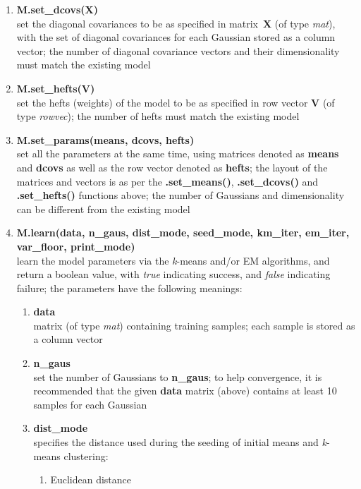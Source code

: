 \documentclass[10pt,a4paper]{article}
\begin{document}
\begin{small}
\begin{enumerate}[{$\bullet$}]
\item
{\bf M.set\_dcovs(X)}\\
set the diagonal covariances to be as specified in matrix~{\bf X} (of type {\it mat}), with the set of diagonal covariances for each Gaussian stored as a column vector;
the number of diagonal covariance vectors and their dimensionality must match the existing model

\item
{\bf M.set\_hefts(V)}\\
set the hefts (weights) of the model to be as specified in row vector {\bf V} (of type {\it rowvec});
the number of hefts must match the existing model

\pagebreak
\item
{\bf M.set\_params(means, dcovs, hefts)}\\
set all the parameters at the same time, using matrices denoted as {\bf means} and {\bf dcovs} as well as the row vector denoted as {\bf hefts};
the layout of the matrices and vectors is as per the {\bf .set\_means()}, {\bf .set\_dcovs()} and {\bf .set\_hefts()} functions above;
the number of Gaussians and dimensionality can be different from the existing model

\item
{\bf M.learn(data, n\_gaus, dist\_mode, seed\_mode, km\_iter, em\_iter, var\_floor, print\_mode)}\\
learn the model parameters via the {\it k}-means and/or EM algorithms,
and return a boolean value, with {\it true} indicating success, and {\it false} indicating failure;
the parameters have the following meanings:

\begin{small}
\begin{enumerate}[{-}]
\itemsep 0.5ex
\item
{\bf data}\\
matrix (of type {\it mat}) containing training samples; each sample is stored as a column vector

\item
{\bf n\_gaus}\\
set the number of Gaussians to {\bf n\_gaus};
to help convergence, it is recommended that the given {\bf data} matrix (above)
contains at least 10 samples for each Gaussian

\item
{\bf dist\_mode}\\
specifies the distance used during the seeding of initial means and \mbox{{\it k}-means} clustering:
\begin{small}
\begin{enumerate}
\item Euclidean distance
\end{enumerate}


\end{small}
\end{enumerate}
\end{small}
\end{enumerate}
\end{small}
\end{document}
